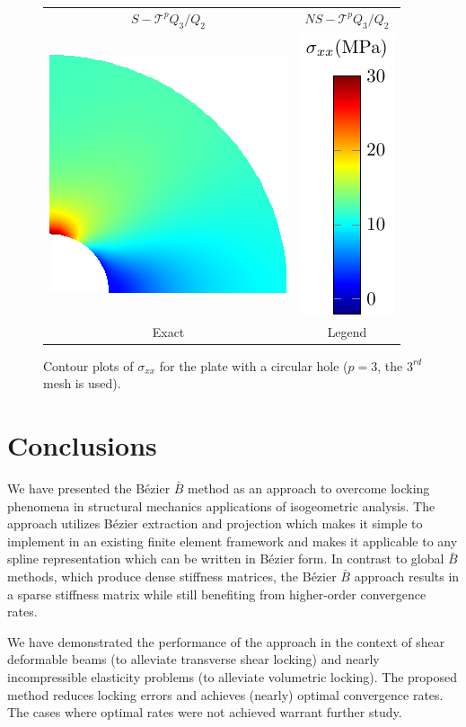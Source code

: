 \documentclass{article}
\newcommand{\Bezier}{{B\'{e}zier} }
\begin{document}
\begin{figure}[htb!]
\begin{tabular}{cc}
    $S-\mathcal{T}^{p} Q_3/Q_2$ & $NS-\mathcal{T}^{p} Q_3/Q_2$\\
    \includegraphics[width=.4\linewidth]{reference_stress_contour} & \includegraphics[width=.13\linewidth]{legend}\\
    Exact & Legend
    \end{tabular}
        \caption{Contour plots of $\sigma_{xx}$ for the plate with a circular hole ($p=3$, the $3^{rd}$ mesh is used).}
        \label{fig:platewithhole_contour}
    \end{figure}
\section{Conclusions}
\label{sec:conclusion}

We have presented the B\'{e}zier $\bar{B}$ method as an approach to overcome locking phenomena in structural mechanics applications of isogeometric analysis. The approach utilizes B\'ezier extraction and projection which makes it simple to implement in an existing finite element framework and makes it applicable to any spline representation which can be written in \Bezier form. In contrast to global $\bar{B}$ methods, which produce dense stiffness matrices, the B\'ezier $\bar{B}$ approach results in a sparse stiffness matrix while still benefiting from higher-order convergence rates.

We have demonstrated the performance of the approach in the context of shear deformable beams (to alleviate transverse shear locking) and nearly incompressible elasticity problems (to alleviate volumetric locking). The proposed method reduces locking errors and achieves (nearly) optimal convergence rates. The cases where optimal rates were not achieved warrant further study.


\end{document}
